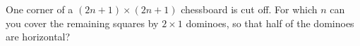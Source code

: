 One corner of a $(2n + 1) \times (2n + 1)$ chessboard is cut off. For which $n$ can you cover the remaining squares by $2 \times 1$ dominoes, so that half of the dominoes are horizontal?
